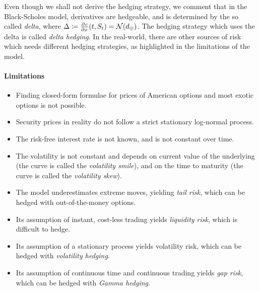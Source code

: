 \begin{rem}[Hedging]
	Even though we shall not derive the hedging strategy, we comment that in the Black-Scholes model, derivatives are hedgeable, and is determined by the so called \emph{delta}, where $ \Delta \coloneqq \pd{c}{x}(t,S_t) = \mathcal{N}(d_{\oplus}) $. The hedging strategy which uses the delta is called \emph{delta hedging}. In the real-world, there are other sources of risk which needs different hedging strategies, as highlighted in the limitations of the model.
\end{rem}


\paragraph{Limitations}
\begin{itemize}
	\item Finding closed-form formulae for prices of American options and most exotic options is not possible.
	\item Security prices in reality do not follow a strict stationary log-normal process.
	\item The risk-free interest rate is not known, and is not constant over time.
	\item The volatility is not constant and depends on current value of the underlying (the curve is called the \emph{volatility smile}), and on the time to maturity (the curve is called the \emph{volatility skew}).
	\item The model underestimates extreme moves, yielding \emph{tail risk}, which can be hedged with out-of-the-money options.
	\item Its assumption of instant, cost-less trading yields \emph{liquidity risk}, which is difficult to hedge.
	\item Its assumption of a stationary process yields volatility risk, which can be hedged with \emph{volatility hedging}.
	\item Its assumption of continuous time and continuous trading yields \emph{gap risk}, which can be hedged with \emph{Gamma hedging}.
\end{itemize}



